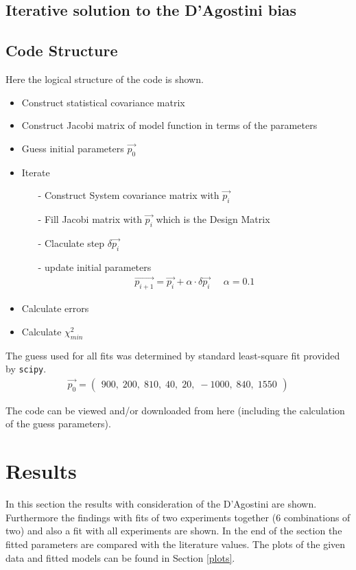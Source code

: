 \documentclass[a4paper]{article}
\begin{document}
\subsection{Iterative solution to the D'Agostini bias}

\subsection{Code Structure}
Here the logical structure of the code is shown.
\begin{itemize}
    \item Construct statistical covariance matrix
    \item Construct Jacobi matrix of model function in terms of the parameters
    \item Guess initial parameters $\vec{p_0}$
    \item Iterate
        \begin{itemize}
            \item[-] Construct System covariance matrix with $\vec{p_{i}}$
            \item[-] Fill Jacobi matrix with $\vec{p_{i}}$ which is the Design Matrix
            \item[-] Claculate step $\delta \vec{p_{i}}$
            \item[-] update initial parameters
                \begin{align*}
                    \vec{p_{i+1}} = \vec{p_{i}} + \alpha \cdot \delta \vec{p_{i}} \;\;\;\;\; \alpha = 0.1
                \end{align*}
        \end{itemize}
    \item Calculate errors
    \item Calculate $\chi^2_{min}$
\end{itemize}

The guess used for all fits was determined by standard least-square fit
provided by \texttt{scipy}.
    \begin{align}
            \vec{p_0} =
            \begin{pmatrix}
            900,\; 200,\; 810,\; 40,\; 20,\; -1000,\; 840,\; 1550
            \end{pmatrix}
    \end{align}

The code can be viewed and/or downloaded from here \cite{code}
(including the calculation of the guess parameters).


\section{Results}
In this section the results with consideration of the D'Agostini are shown.
Furthermore the findings with fits of two experiments together
(6 combinations of two) and also a fit with all experiments
are shown. In the end of the section the fitted parameters are compared with
the literature values. The plots of the given data and fitted models can be found in Section \ref{plots}.
\end{document}
